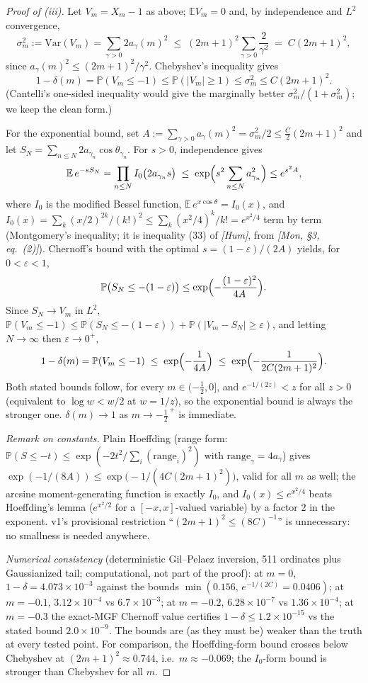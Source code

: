 \begin{proof}[Proof of (iii)]
Let $V_m=X_m-1$ as above; $\mathbb EV_m=0$ and, by independence and
$L^2$ convergence,
\[
\sigma_m^2:=\mathrm{Var}(V_m)=\sum_{\gamma>0}2a_\gamma(m)^2
\;\le\;(2m+1)^2\sum_{\gamma>0}\frac{2}{\gamma^2}\;=\;C(2m+1)^2 ,
\]
since $a_\gamma(m)^2\le(2m+1)^2/\gamma^2$. Chebyshev's inequality
gives
\[
1-\delta(m)=\mathbb P(V_m\le-1)\le\mathbb P(|V_m|\ge1)\le\sigma_m^2
\le C(2m+1)^2 .
\]
(Cantelli's one-sided inequality would give the marginally better
$\sigma_m^2/(1+\sigma_m^2)$; we keep the clean form.)

For the exponential bound, set $A:=\sum_{\gamma>0}a_\gamma(m)^2
=\sigma_m^2/2\le\tfrac{C}{2}(2m+1)^2$ and let
$S_N=\sum_{n\le N}2a_{\gamma_n}\cos\theta_{\gamma_n}$. For $s>0$,
independence gives
\[
\mathbb E\,e^{-sS_N}=\prod_{n\le N}I_0\bigl(2a_{\gamma_n}s\bigr)
\;\le\;\exp\Bigl(s^2\sum_{n\le N}a_{\gamma_n}^2\Bigr)\le e^{s^2A},
\]
where $I_0$ is the modified Bessel function,
$\mathbb E\,e^{x\cos\theta}=I_0(x)$, and
$I_0(x)=\sum_k(x/2)^{2k}/(k!)^2\le\sum_k(x^2/4)^k/k!=e^{x^2/4}$
term by term (Montgomery's inequality; it is inequality (33) of
\emph{[Hum]}, from \emph{[Mon, \S3, eq.~(2)]}). Chernoff's bound with
the optimal $s=(1-\varepsilon)/(2A)$ yields, for
$0<\varepsilon<1$,
\[
\mathbb P\bigl(S_N\le-(1-\varepsilon)\bigr)
\le\exp\Bigl(-\frac{(1-\varepsilon)^2}{4A}\Bigr).
\]
Since $S_N\to V_m$ in $L^2$,
$\mathbb P(V_m\le-1)\le\mathbb P(S_N\le-(1-\varepsilon))
+\mathbb P(|V_m-S_N|\ge\varepsilon)$, and letting $N\to\infty$ then
$\varepsilon\to0^+$,
\[
1-\delta(m)=\mathbb P(V_m\le-1)\;\le\;\exp\Bigl(-\frac1{4A}\Bigr)
\;\le\;\exp\Bigl(-\frac{1}{2C(2m+1)^2}\Bigr).
\]
Both stated bounds follow, for every $m\in(-\tfrac12,0]$, and
$e^{-1/(2z)}<z$ for all $z>0$ (equivalent to $\log w<w/2$ at
$w=1/z$), so the exponential bound is always the stronger one.
$\delta(m)\to1$ as $m\to-\tfrac12^{\,+}$ is immediate.

\emph{Remark on constants.} Plain Hoeffding (range form:
$\mathbb P(S\le-t)\le\exp(-2t^2/\sum_i(\text{range}_i)^2)$ with
$\mathrm{range}_\gamma=4a_\gamma$) gives
$\exp(-1/(8A))\le\exp\bigl(-1/(4C(2m+1)^2)\bigr)$, valid for all $m$ as
well; the arcsine moment-generating function is exactly $I_0$, and
$I_0(x)\le e^{x^2/4}$ beats Hoeffding's lemma
($e^{x^2/2}$ for a $[-x,x]$-valued variable) by a factor $2$ in the
exponent. v1's provisional restriction ``$(2m+1)^2\le(8C)^{-1}$'' is
unnecessary: no smallness is needed anywhere.

\emph{Numerical consistency} (deterministic Gil--Pelaez inversion, 511
ordinates plus Gaussianized tail; computational, not part of the
proof): at $m=0$, $1-\delta=4.073\times10^{-3}$ against the bounds
$\min(0.156,\,e^{-1/(2C)}=0.0406)$; at $m=-0.1$,
$3.12\times10^{-4}$ vs $6.7\times10^{-3}$; at $m=-0.2$,
$6.28\times10^{-7}$ vs $1.36\times10^{-4}$; at $m=-0.3$ the exact-MGF
Chernoff value certifies $1-\delta\le1.2\times10^{-15}$ vs the stated
bound $2.0\times10^{-9}$. The bounds are (as they must be) weaker than
the truth at every tested point. For comparison, the Hoeffding-form
bound crosses below Chebyshev at $(2m+1)^2\approx0.744$, i.e.\
$m\approx-0.069$; the $I_0$-form bound is stronger than Chebyshev for
all $m$.
\end{proof}

